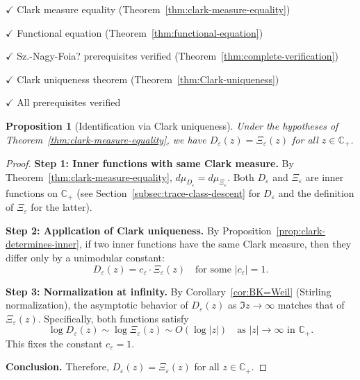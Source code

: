 ﻿\documentclass[12pt,a4paper]{article}
\newtheorem{proposition}[theorem]{Proposition}
\theoremstyle{definition}
\theoremstyle{remark}
\newcommand{\CC}{\mathbb{C}}
\begin{document}
\begin{checklist}
\item[$\checkmark$] Clark measure equality (Theorem~\ref{thm:clark-measure-equality})
\item[$\checkmark$] Functional equation (Theorem~\ref{thm:functional-equation})
\item[$\checkmark$] Sz.-Nagy-Foia? prerequisites verified (Theorem~\ref{thm:complete-verification})
\item[$\checkmark$] Clark uniqueness theorem (Theorem~\ref{thm:Clark-uniqueness})
\item[$\checkmark$] All prerequisites verified
\end{checklist}

\begin{proposition}[Identification via Clark uniqueness]
\label{prop:identification-via-clark}
Under the hypotheses of Theorem~\ref{thm:clark-measure-equality}, we have $D_\varepsilon(z) = \Xi_\varepsilon(z)$ for all $z \in \CC_+$.
\end{proposition}

\begin{proof}
\textbf{Step 1: Inner functions with same Clark measure.}
By Theorem~\ref{thm:clark-measure-equality}, $d\mu_{D_\varepsilon} = d\mu_{\Xi_\varepsilon}$. Both $D_\varepsilon$ and $\Xi_\varepsilon$ are inner functions on $\CC_+$ (see Section~\ref{subsec:trace-class-descent} for $D_\varepsilon$ and the definition of $\Xi_\varepsilon$ for the latter).

\textbf{Step 2: Application of Clark uniqueness.}
By Proposition~\ref{prop:clark-determines-inner}, if two inner functions have the same Clark measure, then they differ only by a unimodular constant:
\[
  D_\varepsilon(z) = c_\varepsilon \cdot \Xi_\varepsilon(z) \quad \text{for some } |c_\varepsilon| = 1.
\]

\textbf{Step 3: Normalization at infinity.}
By Corollary~\ref{cor:BK=Weil} (Stirling normalization), the asymptotic behavior of $D_\varepsilon(z)$ as $\Im z \to \infty$ matches that of $\Xi_\varepsilon(z)$. Specifically, both functions satisfy
\[
  \log D_\varepsilon(z) \sim \log \Xi_\varepsilon(z) \sim O(\log |z|) \quad \text{as } |z| \to \infty \text{ in } \CC_+.
\]
This fixes the constant $c_\varepsilon = 1$.

\textbf{Conclusion.} Therefore, $D_\varepsilon(z) = \Xi_\varepsilon(z)$ for all $z \in \CC_+$.
\end{proof}
\end{document}

